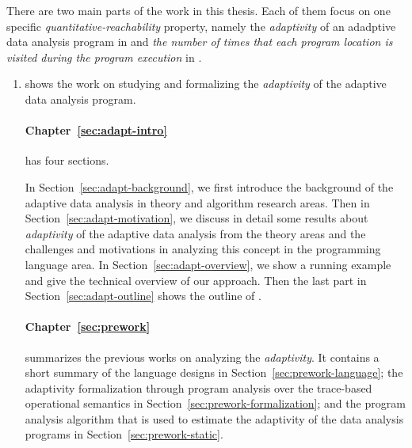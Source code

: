 There are two main parts of the work in this thesis.
Each of them focus on one specific \emph{quantitative-reachability} property,
namely the \emph{adaptivity} of an adadptive data analysis program in 
and \emph{the number of times that each program location is visited during the program execution} in .
\begin{enumerate}

 \item {}
 shows the work on studying and formalizing the \emph{adaptivity} of the adaptive data analysis program. 

 \paragraph{Chapter~\ref{sec:adapt-intro}} has four sections.
 
 In Section~\ref{sec:adapt-background}, we first introduce the background of
 the adaptive data analysis in theory and algorithm research areas.
 Then in Section~\ref{sec:adapt-motivation}, we discuss in detail some results
 about \emph{adaptivity} of the adaptive data analysis from the theory areas and the challenges and motivations in analyzing
 this concept in the programming language area.
 In Section~\ref{sec:adapt-overview}, we show a running example and give the technical overview of our approach.
 Then the last part in Section~\ref{sec:adapt-outline} shows the outline of .
 
 \paragraph{Chapter~\ref{sec:prework}} summarizes the previous works on analyzing the \emph{adaptivity}.
 It contains a short summary of the language designs in Section~\ref{sec:prework-language};
 the adaptivity formalization through program analysis over the trace-based operational semantics in Section~\ref{sec:prework-formalization};
 and the program analysis algorithm that is used to estimate the adaptivity of the data analysis programs 
 in Section~\ref{sec:prework-static}.



\end{enumerate}

